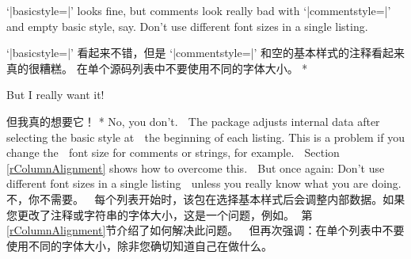\begin{advise}
\begin{paracol}{2} 
\item `|basicstyle=\small|' looks fine, but comments look really bad with
      `|commentstyle=\tiny|' and empty basic style, say.
      \advisespace
      Don't use different font sizes in a single listing.
\switchcolumn
\item `|basicstyle=\small|' 看起来不错，但是 `|commentstyle=\tiny|' 和空的基本样式的注释看起来真的很糟糕。
\advisespace
在单个源码列表中不要使用不同的字体大小。
\switchcolumn[0]*
\item But I really want it!
\switchcolumn
\item 但我真的想要它！
      \advisespace
\switchcolumn[0]*
      No, you don't.
^^A       The package adjusts internal data after selecting the basic style at
^^A       the beginning of each listing. This is a problem if you change the
^^A       font size for comments or strings, for example.
^^A       Section \ref{rColumnAlignment} shows how to overcome this.
^^A       But once again: Don't use different font sizes in a single listing
^^A       unless you really know what you are doing.
\switchcolumn
不，你不需要。
^^A 每个列表开始时，该包在选择基本样式后会调整内部数据。如果您更改了注释或字符串的字体大小，这是一个问题，例如。
^^A 第\ref{rColumnAlignment}节介绍了如何解决此问题。
^^A 但再次强调：在单个列表中不要使用不同的字体大小，除非您确切知道自己在做什么。
\end{paracol}
\end{advise}


